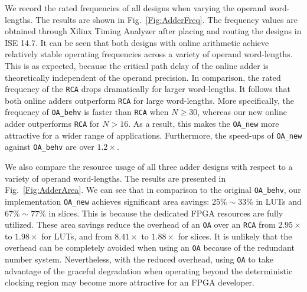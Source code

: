 \documentclass[conference]{IEEEtran}
\begin{document}
We record the rated frequencies of all designs when varying the operand word-lengths. The results are shown in Fig.~\ref{Fig:AdderFreq}. The frequency values are obtained through Xilinx Timing Analyzer after placing and routing the designs in ISE 14.7. It can be seen that both designs with online arithmetic achieve relatively stable operating frequencies across a variety of operand word-lengths. This is as expected, because the critical path delay of the online adder is theoretically independent of the operand precision. In comparison, the rated frequency of the \texttt{RCA} drops dramatically for larger word-lengths. It follows that both online adders outperform \texttt{RCA} for large word-lengths. More specifically, the frequency of \texttt{OA\_behv} is faster than \texttt{RCA} when $N\geqslant30$, whereas our new online adder outperforms \texttt{RCA} for $N>16$. As a result, this makes the \texttt{OA\_new} more attractive for a wider range of applications. Furthermore, the speed-ups of \texttt{OA\_new} against \texttt{OA\_behv} are over $1.2\times$.



We also compare the resource usage of all three adder designs with respect to a variety of operand word-lengths. The results are presented in Fig.~\ref{Fig:AdderArea}. We can see that in comparison to the original \texttt{OA\_behv}, our implementation \texttt{OA\_new} achieves significant area savings: $25\%\sim 33\%$ in LUTs and $67\%\sim77\%$ in slices. This is because the dedicated FPGA resources are fully utilized. These area savings reduce the overhead of an \texttt{OA} over an \texttt{RCA} from $2.95\times$ to $1.98\times$ for LUTs, and from $8.41\times$ to $1.88\times$ for slices. It is unlikely that the overhead can be completely avoided when using an \texttt{OA} because of the redundant number system. Nevertheless, with the reduced overhead, using \texttt{OA} to take advantage of the graceful degradation when operating beyond the deterministic clocking region may become more attractive for an FPGA developer.

\end{document}
